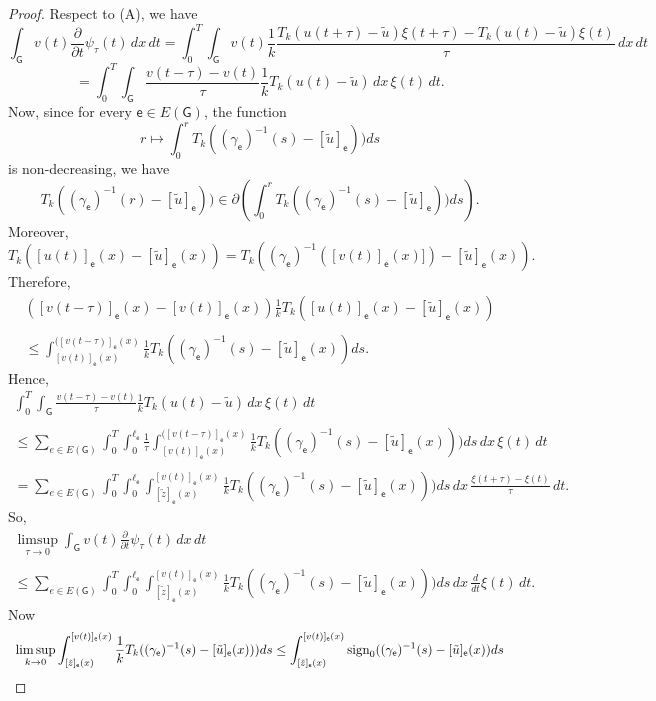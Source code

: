 \documentclass[reqno,12pt]{amsart}
\def\e{\mathsf{e}} 	%
\newcommand{\G}{\mathsf{G}}	%
\numberwithin{equation}{section} %
\begin{document}
\begin{proof}
  Respect to (A), we have
$$\int_\G v(t) \frac{\partial}{\partial t} \psi_\tau(t)\,dx\, dt = \int_0^T \int_\G v(t) \frac{1}{k}  \frac{T_k(u(t+\tau)-\tilde u)\xi(t+\tau)-T_k(u(t)-\tilde u)\xi(t)}{\tau}\,dx\, dt$$ $$=\int_0^T \int_\G \frac{v(t-\tau)-v(t)}{\tau}  \frac{1}{k} T_k(u(t)-\tilde u) \,dx\,\xi(t)\, dt.$$
Now, since for every $\e \in E(\G)$, the function 
$$r \mapsto   \int_0^r T_k((\gamma_\e)^{-1}(s)- [\tilde u]_\e)) ds $$
is non-decreasing, we have
$$  T_k((\gamma_\e)^{-1}(r)- [\tilde u]_\e)) \in \partial \left(   \int_0^r T_k((\gamma_\e)^{-1}(s)- [\tilde u]_\e)) ds \right).$$
Moreover,
$$ T_k([u(t)]_\e(x)-[\tilde u]_\e(x)) =    T_k((\gamma_\e)^{-1}([v(t)]_\e(x)])-[\tilde u]_\e(x)).$$
Therefore,
$$\begin{array}{c}
\displaystyle([v(t - \tau) ]_\e(x) - [v(t)]_\e(x) ) \frac{1}{k} T_k([u(t)]_\e(x)-[\tilde u]_\e(x)) \\
\\ \displaystyle\leq \int_{[v(t)]_\e(x) }^{([v (t - \tau)]_\e(x)} \frac{1}{k}  T_k((\gamma_\e)^{-1}(s)- [\tilde u]_\e(x)) ds.
\end{array}$$
Hence,
$$\begin{array}{c}
\displaystyle\int_0^T \int_\G \frac{v(t-\tau)-v(t)}{\tau}  \frac{1}{k} T_k(u(t)-\tilde u) \,dx\, \xi(t)\, dt 
\\ \\ \displaystyle
\leq\sum_{e \in E(\G)} \int_0^T  \int_0^{\ell_\e}\frac{1}{\tau}\int_{[v(t)]_\e(x) }^{([v(t - \tau)]_\e(x) }  \frac{1}{k}  T_k((\gamma_\e)^{-1}(s)- [\tilde u]_\e(x))) ds  \, dx \,  \xi(t)\, dt
\\ \\ \displaystyle
= \sum_{e \in E(\G)}\int_0^T \int_0^{\ell_\e} \int_{[\tilde z]_\e(x)}^{[v(t)]_\e (x)}\frac{1}{k}  T_k((\gamma_\e)^{-1}(s)- [\tilde u]_\e(x))) ds \, dx \,  \frac{\xi(t+\tau) - \xi(t)}{\tau}\,dt.
\end{array}
$$
So, 
$$
\begin{array}{c}
\displaystyle
\limsup_{\tau\to 0} \int_\G v(t) \frac{\partial}{\partial t} \psi_\tau(t)\,dx\, dt 
\\ \\ \displaystyle
\leq  \sum_{e \in E(\G)}\int_0^T\int_0^{\ell_\e} \int_{[\tilde z]_\e(x)}^{[v(t)]_\e (x)}\frac{1}{k}  T_k((\gamma_\e)^{-1}(s)- [\tilde u]_\e(x))) ds \, dx \,   \frac{d}{dt}\xi(t)\,dt.
\end{array}
$$
Now 
$$
\begin{array}{c}\displaystyle
\limsup_{k\to 0}  \int_{[\tilde z]_\e(x)}^{[v(t)]_\e (x)}\frac{1}{k}  T_k((\gamma_\e)^{-1}(s)- [\tilde u]_\e(x))) ds \le \int_{[\tilde z]_\e(x)}^{[v(t)]_\e (x)}  \hbox{sign}_0 ((\gamma_\e)^{-1}(s)- [\tilde u]_\e(x)) ds

\end{array}$$
\end{proof}
\end{document}
